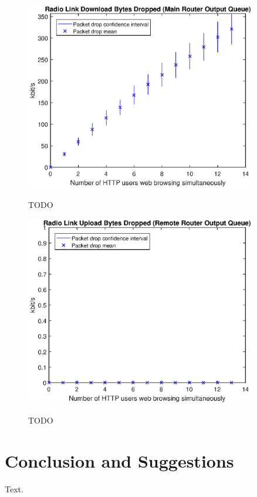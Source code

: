 \documentclass[a4paper,10pt]{book}\usepackage{graphicx}
\begin{document}
\begin{figure}[!ht]
  \centering
    \includegraphics[width=0.9\textwidth]{on_main_router_drops.eps}
    \label{fig:on_main_router_drops}
    \caption{TODO}
\end{figure}

\begin{figure}[!ht]
  \centering
    \includegraphics[width=0.9\textwidth]{on_remote_router_drops.eps}
    \label{fig:on_remote_router_drops}
    \caption{TODO}
\end{figure}
         

\chapter{Conclusion and Suggestions}

Text.

	
	
\end{document}
